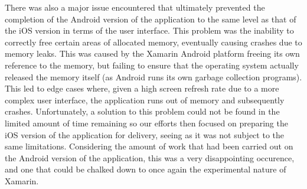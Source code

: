 \documentclass[main.tex]{subfiles}
\begin{document}
            There was also a major issue encountered that ultimately prevented the completion of the Android version of the application to the same level as that of the iOS version
            in terms of the user interface. This problem was the inability to correctly free certain areas of allocated memory, eventually causing crashes due to memory leaks. This was
            caused by the Xamarin Android platform freeing its own reference to the memory, but failing to ensure that the operating system actually released the memory itself
            (as Android runs its own garbage collection programs). This led to edge cases where, given a high screen refresh rate due to a more complex user interface, the application
            runs out of memory and subsequently crashes. Unfortunately, a solution to this problem could not be found in the limited amount of time remaining
            so our efforts then focused on preparing the iOS version of the application for delivery, seeing as it was not subject to the same limitations. Considering the amount of work that had been carried out on the Android version of the application, this was a very disappointing occurence, and one that could be chalked down to once again the experimental nature of Xamarin.
\end{document}
